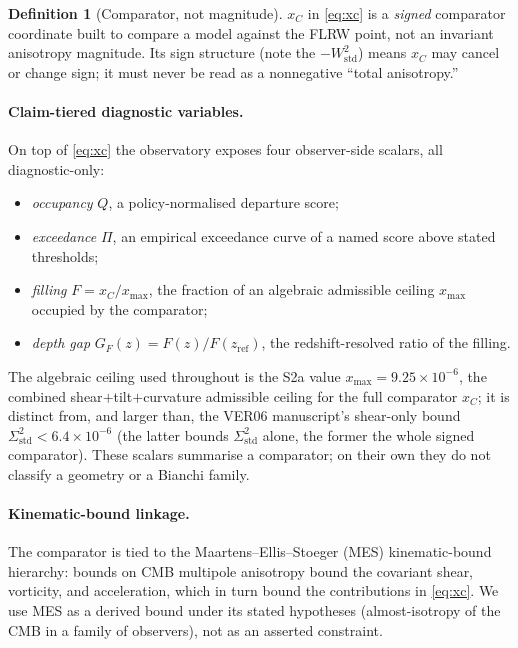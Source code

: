 \documentclass[11pt,a4paper]{article}
\newcommand{\xC}{x_{C}}
\newcommand{\xmax}{x_{\max}}
\newcommand{\Sigstd}{\Sigma^{2}_{\mathrm{std}}}
\newcommand{\Wstd}{W^{2}_{\mathrm{std}}}
\newcommand{\GF}{G_{F}}
\theoremstyle{plain}
\theoremstyle{definition}
\newtheorem{definition}{Definition}
\begin{document}
\begin{definition}[Comparator, not magnitude]
$\xC$ in \eqref{eq:xc} is a \emph{signed} comparator coordinate
built to compare a model against the FLRW point, not an invariant
anisotropy magnitude. Its sign structure (note the $-\Wstd$) means
$\xC$ may cancel or change sign; it must never be read as a
nonnegative ``total anisotropy.''
\end{definition}

\paragraph{Claim-tiered diagnostic variables.}
On top of \eqref{eq:xc} the observatory exposes four observer-side
scalars, all diagnostic-only:
\begin{itemize}[leftmargin=1.4em,itemsep=2pt]
  \item \emph{occupancy} $Q$, a policy-normalised departure score;
  \item \emph{exceedance} $\Pi$, an empirical exceedance curve of a
        named score above stated thresholds;
  \item \emph{filling} $F=\xC/\xmax$, the fraction of an algebraic
        admissible ceiling $\xmax$ occupied by the comparator;
  \item \emph{depth gap} $\GF(z)=F(z)/F(z_{\mathrm{ref}})$, the
        redshift-resolved ratio of the filling.
\end{itemize}
The algebraic ceiling used throughout is the S2a value
$\xmax = 9.25\times10^{-6}$, the combined shear$+$tilt$+$curvature
admissible ceiling for the full comparator $\xC$; it is distinct from,
and larger than, the VER06 manuscript's shear-only bound
$\Sigstd<6.4\times10^{-6}$ (the latter bounds $\Sigstd$ alone, the
former the whole signed comparator). These scalars summarise a
comparator; on their own they do not classify a geometry or a Bianchi
family.

\paragraph{Kinematic-bound linkage.}
The comparator is tied to the Maartens--Ellis--Stoeger (MES)
kinematic-bound hierarchy: bounds on CMB multipole anisotropy bound
the covariant shear, vorticity, and acceleration, which in turn
bound the contributions in \eqref{eq:xc}. We use MES as a derived
bound under its stated hypotheses (almost-isotropy of the CMB in a
family of observers), not as an asserted constraint.
\end{document}
